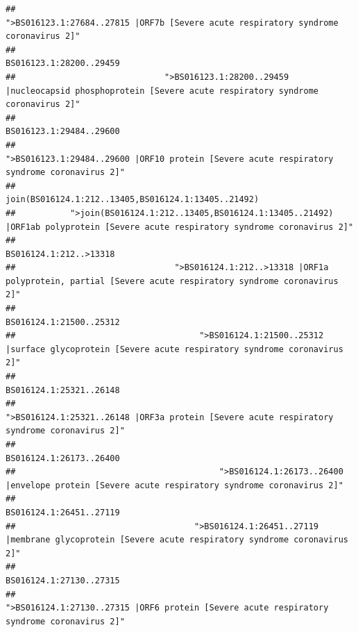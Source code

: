 \documentclass[
]{article}
\begin{document}
\begin{verbatim}
##                                                    ">BS016123.1:27684..27815 |ORF7b [Severe acute respiratory syndrome coronavirus 2]" 
##                                                                                                                BS016123.1:28200..29459 
##                              ">BS016123.1:28200..29459 |nucleocapsid phosphoprotein [Severe acute respiratory syndrome coronavirus 2]" 
##                                                                                                                BS016123.1:29484..29600 
##                                            ">BS016123.1:29484..29600 |ORF10 protein [Severe acute respiratory syndrome coronavirus 2]" 
##                                                                                    join(BS016124.1:212..13405,BS016124.1:13405..21492) 
##           ">join(BS016124.1:212..13405,BS016124.1:13405..21492) |ORF1ab polyprotein [Severe acute respiratory syndrome coronavirus 2]" 
##                                                                                                                 BS016124.1:212..>13318 
##                                ">BS016124.1:212..>13318 |ORF1a polyprotein, partial [Severe acute respiratory syndrome coronavirus 2]" 
##                                                                                                                BS016124.1:21500..25312 
##                                     ">BS016124.1:21500..25312 |surface glycoprotein [Severe acute respiratory syndrome coronavirus 2]" 
##                                                                                                                BS016124.1:25321..26148 
##                                            ">BS016124.1:25321..26148 |ORF3a protein [Severe acute respiratory syndrome coronavirus 2]" 
##                                                                                                                BS016124.1:26173..26400 
##                                         ">BS016124.1:26173..26400 |envelope protein [Severe acute respiratory syndrome coronavirus 2]" 
##                                                                                                                BS016124.1:26451..27119 
##                                    ">BS016124.1:26451..27119 |membrane glycoprotein [Severe acute respiratory syndrome coronavirus 2]" 
##                                                                                                                BS016124.1:27130..27315 
##                                             ">BS016124.1:27130..27315 |ORF6 protein [Severe acute respiratory syndrome coronavirus 2]" 

\end{verbatim}
\end{document}

